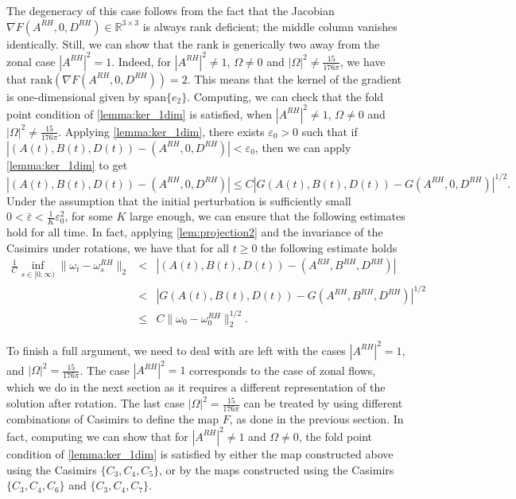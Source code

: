 \documentclass{amsart}
\def\R{{\mathbb{R}}}
\def\eps{{\varepsilon}}
\begin{document}
The degeneracy of this case follows from the fact that the Jacobian $\nabla F(A^{RH},0,D^{RH})\in \R^{3\times 3}$ is always rank deficient; the middle column vanishes identically. Still, we can show that the rank is generically two away from the zonal case $|A^{RH}|^2=1$. Indeed, for $|A^{RH}|^2\ne 1$, $\Omega\ne 0$ and $|\Omega|^2\ne \frac{15}{176\pi}$, we have that $\mathrm{rank}(\nabla F(A^{RH},0,D^{RH}))=2$. This means that the kernel of the gradient is one-dimensional given by $\mathrm{span}\{e_2\}$. Computing, we can check that the fold point condition of \cref{lemma:ker_1dim} is satisfied, when $|A^{RH}|^2\ne 1$, $\Omega\ne 0$ and $|\Omega|^2\ne \frac{15}{176\pi}$. Applying \cref{lemma:ker_1dim}, there exists $\eps_0>0$ such that if $|(A(t),B(t),D(t))-(A^{RH},0,D^{RH})|<\eps_0$, then we can apply \cref{lemma:ker_1dim} to get
\begin{equation*}
    |(A(t),B(t),D(t))-(A^{RH},0,D^{RH})|\leq C|G(A(t),B(t),D(t))-G(A^{RH},0,D^{RH})|^{1/2}.
\end{equation*}
Under the assumption that the initial perturbation is sufficiently small $0<\bar\eps<\frac{1}{K}\eps_0^2$, for some $K$ large enough, we can ensure that the following estimates hold for all time. In fact, applying \cref{lem:projection2} and the invariance of the Casimirs under rotations, we have that for all $t\geq0$ the following estimate holds
\begin{eqnarray*}
    \frac{1}{C}\inf_{s\in[0,\infty)}\|\omega_t-\omega^{RH}_s\|_2&<&|(A(t),B(t),D(t))-(A^{RH},B^{RH},D^{RH})|\\
    &<&|G(A(t),B(t),D(t))-G(A^{RH},B^{RH},D^{RH})|^{1/2}\\
    &\leq& C\|\omega_0-\omega^{RH}_0\|_2^{1/2}.
    \label{eq:final_Ck_degenerate}
\end{eqnarray*}

To finish a full argument, we need to deal with are left with the cases $|A^{RH}|^2=1$, and $|\Omega|^2= \frac{15}{176\pi}$. The case $|A^{RH}|^2=1$ corresponds to the case of zonal flows, which we do in the next section as it requires a different representation of the solution after rotation. The last case $|\Omega|^2= \frac{15}{176\pi}$ can be treated by using different combinations of Casimirs to define the map $F$, as done in the previous section. In fact, computing we can show that for $|A^{RH}|^2\ne 1$ and $\Omega\ne 0$, the fold point condition of \cref{lemma:ker_1dim} is satisfied by either the map constructed above using the Casimirs $\{C_3,C_4,C_5\}$, or by the maps constructed using the Casimirs $\{C_3,C_4,C_6\}$ and $\{C_3,C_4,C_7\}$. 
\end{document}
